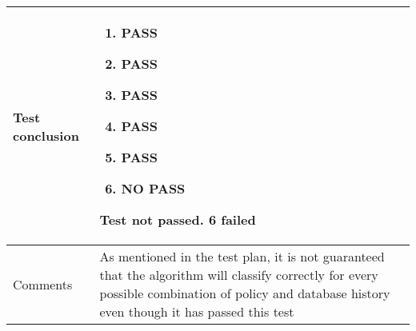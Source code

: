 \begin{center}
\begin{longtable}{ | p{4cm} | p{10cm} | }
			Test conclusion & 	\begin{enumerate}
							\item PASS
							\item PASS
							\item PASS
							\item PASS
							\item PASS
							\item NO PASS
						\end{enumerate}
						Test not passed. 6 failed \\  [3pt] \hline
			Comments & As mentioned in the test plan, it is not guaranteed that the algorithm will classify correctly for every possible combination of policy and database history even though it has passed this test
					\\ [3pt] \hline
		\end{longtable}
	\end{center}

